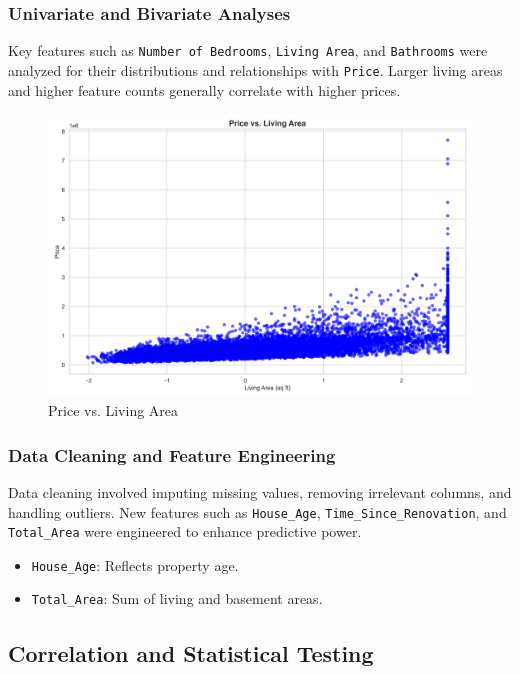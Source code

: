 \documentclass[11pt]{article}
\begin{document}
\subsubsection{Univariate and Bivariate Analyses}
Key features such as \texttt{Number of Bedrooms}, \texttt{Living Area}, and \texttt{Bathrooms} were analyzed for their distributions and relationships with \texttt{Price}. Larger living areas and higher feature counts generally correlate with higher prices.

\begin{figure}[htbp]
    \centering
    \includegraphics[width=\linewidth]{results/figures/price_vs_living_area.png}
    \caption{Price vs. Living Area}
    \label{fig:price_vs_living_area}
\end{figure}

\subsubsection{Data Cleaning and Feature Engineering}
Data cleaning involved imputing missing values, removing irrelevant columns, and handling outliers. New features such as \texttt{House\_Age}, \texttt{Time\_Since\_Renovation}, and \texttt{Total\_Area} were engineered to enhance predictive power.

\begin{itemize}
    \item \texttt{House\_Age}: Reflects property age.
    \item \texttt{Total\_Area}: Sum of living and basement areas.
\end{itemize}

\subsection{Correlation and Statistical Testing}
\end{document}
